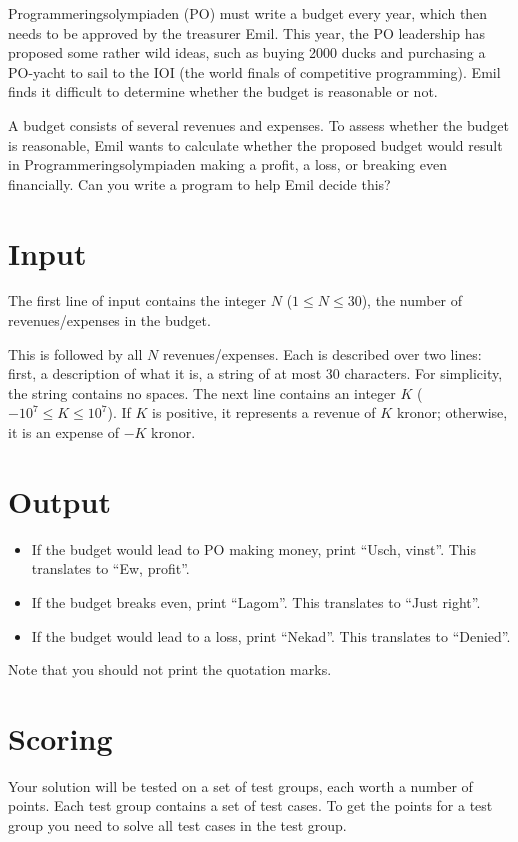 
Programmeringsolympiaden (PO) must write a budget every year, which then needs to be approved by the
treasurer Emil. This year, the PO leadership has proposed some rather wild ideas, such as buying
2000 ducks and purchasing a PO-yacht to sail to the IOI (the world finals of competitive programming).
Emil finds it difficult to determine whether the budget is reasonable or not.

A budget consists of several revenues and expenses.
To assess whether the budget is reasonable, Emil wants to calculate whether the proposed budget would
result in Programmeringsolympiaden making a profit, a loss, or breaking even financially. Can you write a program to help Emil decide this?

\section*{Input}
The first line of input contains the integer $N$ ($1 \leq N \leq 30$), the number of revenues/expenses in the budget.

This is followed by all $N$ revenues/expenses. Each is described over two lines: first, a description of what it is,
a string of at most 30 characters. For simplicity, the string contains no spaces.  
The next line contains an integer $K$ ($-10^7 \leq K \leq 10^7$). If $K$ is positive, it represents a revenue of $K$ kronor;
otherwise, it is an expense of $-K$ kronor.

\section*{Output}
\begin{itemize}
  \item If the budget would lead to PO making money, print ``Usch, vinst''. This translates to ``Ew, profit''.
  \item If the budget breaks even, print ``Lagom''. This translates to ``Just right''.
  \item If the budget would lead to a loss, print ``Nekad''. This translates to ``Denied''.
\end{itemize}
Note that you should not print the quotation marks.

\section*{Scoring}
Your solution will be tested on a set of test groups, each worth a number of points. Each test group contains
a set of test cases. To get the points for a test group you need to solve all test cases in the test group.

